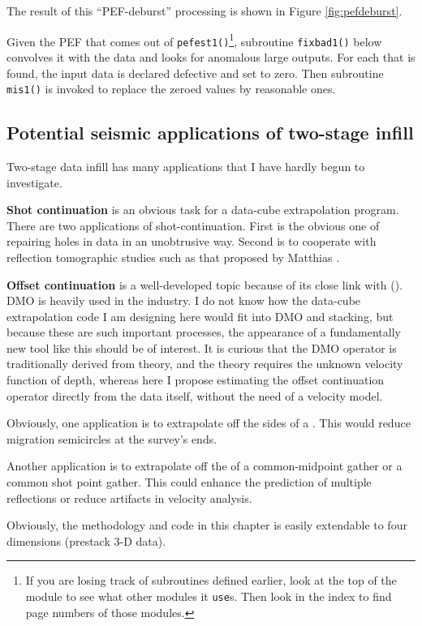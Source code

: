 The result of this ``PEF-deburst'' processing
is shown in Figure \ref{fig:pefdeburst}.
\par
Given the PEF that comes out of \texttt{pefest1()}\footnote{
        If you are losing track of subroutines defined earlier,
        look at the top of the module to see what other modules
        it \texttt{use}s.
        Then look in the index to find page numbers of those modules.
        }, subroutine
\texttt{fixbad1()} below convolves it with the data and looks for
anomalous large outputs.  For each that is found, the input data is
declared defective and set to zero.  Then subroutine \texttt{mis1()}
 is invoked to replace the zeroed values by
reasonable ones.



\subsection{Potential seismic applications of two-stage infill}
Two-stage data infill has many applications
that I have hardly begun to investigate.
\par {\bf Shot continuation}
is an obvious task for a data-cube extrapolation program.
There are two applications of shot-continuation.
First is the obvious one of repairing holes in data
in an unobtrusive way.
Second is to cooperate with reflection tomographic studies
such as that proposed by Matthias .
\par {\bf Offset continuation} is a well-developed topic because
of its close link with  ().
DMO is heavily used in the industry.
I do not know how the data-cube extrapolation code I
am designing here would fit into DMO and stacking,
but because these are such important processes,
the appearance of a fundamentally new tool like
this should be of interest.
It is curious that the DMO operator is traditionally
derived from theory, and the theory requires the
unknown velocity function of depth, whereas here
I propose estimating the offset continuation operator
directly from the data itself, without the need of a velocity model.
\par
Obviously, one application is to extrapolate off the sides of a
.
This would reduce migration semicircles
at the survey's ends.
\par
Another application is to extrapolate off the
of a common-midpoint gather or
a common shot point gather.
This could enhance
the prediction of
multiple reflections
or reduce artifacts in velocity analysis.
\par
Obviously, the methodology and code in this chapter
is easily extendable to four dimensions (prestack 3-D data).
%


